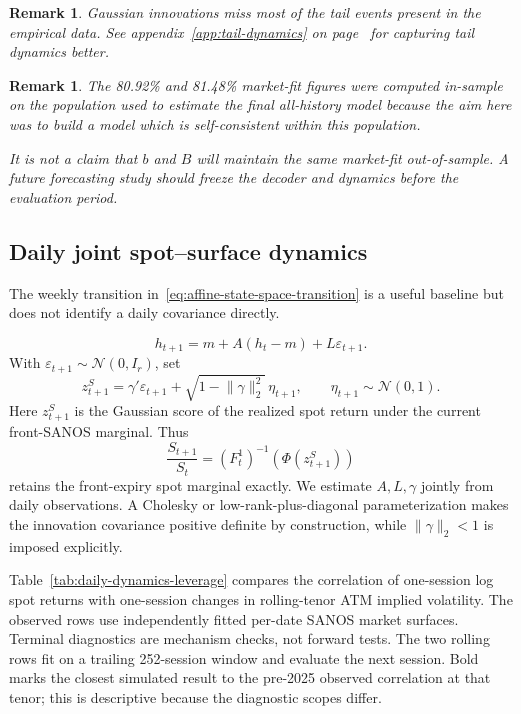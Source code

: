 \documentclass[11pt,a4paper]{article}
\newtheorem{remark}[definition]{Remark}
\begin{document}
\begin{remark}
  Gaussian innovations miss most of the tail events present in the empirical data. See appendix~\ref{app:tail-dynamics} on page~\pageref{app:tail-dynamics}
  for capturing tail dynamics better.
\end{remark}

\begin{remark}
The 80.92\% and 81.48\% market-fit figures were computed in-sample on the population used to estimate
the final all-history model because the aim here was to build a model which is self-consistent within this population.

It is not a claim that $b$ and $B$ will maintain the same market-fit out-of-sample.
A future forecasting study should freeze the decoder and dynamics
before the evaluation period.
\end{remark}

\subsection{Daily joint spot--surface dynamics}
\label{sec:daily-joint-dynamics}

The weekly transition in~\eqref{eq:affine-state-space-transition} is a useful
baseline but does not identify a daily covariance directly.

\[
  h_{t+1}=m+A(h_t-m)+L\varepsilon_{t+1}.
\]
With \(\varepsilon_{t+1}\sim\mathcal N(0,I_r)\), set
\[
  z^S_{t+1}
    =\gamma'\varepsilon_{t+1}
      +\sqrt{1-\lVert\gamma\rVert_2^2}\,\eta_{t+1},
  \qquad \eta_{t+1}\sim\mathcal N(0,1).
\]
Here \(z^S_{t+1}\) is the Gaussian score of the realized spot return under
the current front-SANOS marginal.  Thus
\[
  \frac{S_{t+1}}{S_t}
  =(F_t^1)^{-1}\!\left(\Phi(z^S_{t+1})\right)
\]
retains the front-expiry spot marginal exactly.  We estimate \(A,L,\gamma\)
jointly from daily observations.  A Cholesky or low-rank-plus-diagonal
parameterization makes the innovation covariance positive definite by
construction, while \(\lVert\gamma\rVert_2<1\) is imposed explicitly.

Table~\ref{tab:daily-dynamics-leverage} compares the correlation of
one-session log spot returns with one-session changes in rolling-tenor ATM
implied volatility.  The observed rows use independently fitted per-date
SANOS market surfaces.  Terminal diagnostics are mechanism checks, not
forward tests.  The two rolling rows fit on a trailing 252-session window and
evaluate the next session.  Bold marks the closest simulated result to the
pre-2025 observed correlation at that tenor; this is descriptive because the
diagnostic scopes differ.
\end{document}
